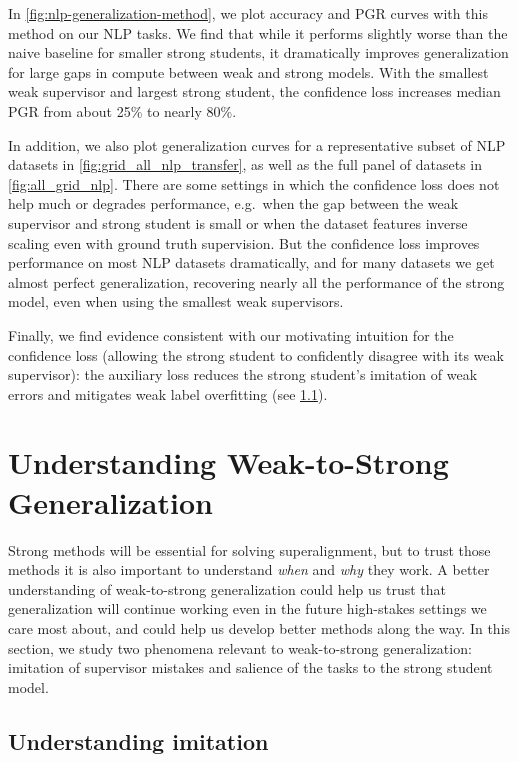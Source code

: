 In \ref{fig:nlp-generalization-method}, we plot accuracy and PGR curves with this method on our NLP tasks. We find that while it performs slightly worse than the naive baseline for smaller strong students, it dramatically improves generalization for large gaps in compute between weak and strong models. With the smallest weak supervisor and largest strong student, the confidence loss increases median PGR from about 25\% to nearly 80\%.  

In addition, we also plot generalization curves for a representative subset of NLP datasets in \ref{fig:grid_all_nlp_transfer}, as well as the full panel of datasets in \ref{fig:all_grid_nlp}.
There are some settings in which the confidence loss does not help much or degrades performance, e.g.~when the gap between the weak supervisor and strong student is small or when the dataset features inverse scaling even with ground truth supervision. But the confidence loss improves performance on most NLP datasets dramatically, and for many datasets we get almost perfect generalization, recovering nearly all the performance of the strong model, even when using the smallest weak supervisors. 

Finally, we find evidence consistent with our motivating intuition for the confidence loss (allowing the strong student to confidently disagree with its weak supervisor): the auxiliary loss reduces the strong student's imitation of weak errors and mitigates weak label overfitting (see \ref{sec:imitation}). 

\section{Understanding Weak-to-Strong Generalization}
\label{sec:understanding}

Strong methods will be essential for solving superalignment, but to trust those methods it is also important to understand \textit{when} and \textit{why} they work. A better understanding of weak-to-strong generalization could help us trust that generalization will continue working even in the future high-stakes settings we care most about, and could help us develop better methods along the way. In this section, we study two phenomena relevant to weak-to-strong generalization: imitation of supervisor mistakes and salience of the tasks to the strong student model.

\subsection{Understanding imitation}
\label{sec:imitation}


